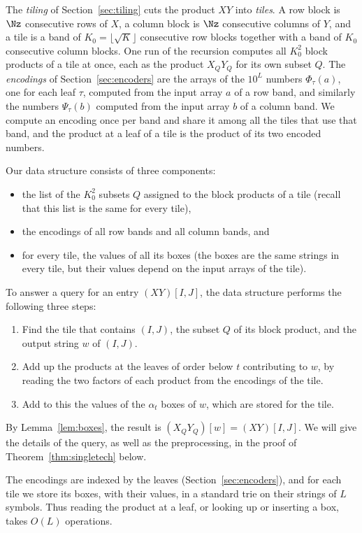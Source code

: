 The \emph{tiling} of Section~\ref{sec:tiling} cuts the product $XY$ into \emph{tiles}. A row block is $\Nz$ consecutive rows of $X$, a column block is $\Nz$ consecutive columns of $Y$, and a tile is a band of $K_0=\lfloor\sqrt K\rfloor$ consecutive row blocks together with a band of $K_0$ consecutive column blocks. One run of the recursion computes all $K_0^2$ block products of a tile at once, each as the product $X_QY_Q$ for its own subset $Q$. The \emph{encodings} of Section~\ref{sec:encoders} are the arrays of the $10^L$ numbers $\Phi_\tau(a)$, one for each leaf $\tau$, computed from the input array $a$ of a row band, and similarly the numbers $\Psi_\tau(b)$ computed from the input array $b$ of a column band. We compute an encoding once per band and share it among all the tiles that use that band, and the product at a leaf of a tile is the product of its two encoded numbers.

Our data structure consists of three components:
\begin{itemize}[nosep]
\item the list of the $K_0^2$ subsets $Q$ assigned to the block products of a tile (recall that this list is the same for every tile),
\item the encodings of all row bands and all column bands, and
\item for every tile, the values of all its boxes (the boxes are the same strings in every tile, but their values depend on the input arrays of the tile).
\end{itemize}
To answer a query for an entry $(XY)[I,J]$, the data structure performs the following three steps:
\begin{enumerate}[label=(\arabic*),nosep]
\item Find the tile that contains $(I,J)$, the subset $Q$ of its block product, and the output string $w$ of $(I,J)$.
\item Add up the products at the leaves of order below $t$ contributing to $w$, by reading the two factors of each product from the encodings of the tile.
\item Add to this the values of the $\alpha_t$ boxes of $w$, which are stored for the tile.
\end{enumerate}
By Lemma~\ref{lem:boxes}, the result is $(X_QY_Q)[w]=(XY)[I,J]$. We will give the details of the query, as well as the preprocessing, in the proof of Theorem~\ref{thm:singletech} below.

The encodings are indexed by the leaves (Section~\ref{sec:encoders}), and for each tile we store its boxes, with their values, in a standard trie on their strings of $L$ symbols. Thus reading the product at a leaf, or looking up or inserting a box, takes $O(L)$ operations.

